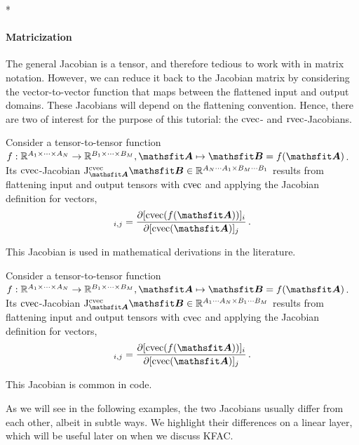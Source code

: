 \switchcolumn[1]*
\switchcolumn[0]

\paragraph{Matricization} The general Jacobian is a tensor, and therefore tedious to work with in matrix notation.
However, we can reduce it back to the Jacobian matrix by considering the vector-to-vector function that maps between the flattened input and output domains.
These Jacobians will depend on the flattening convention.
Hence, there are two of interest for the purpose of this tutorial: the $\operatorname{cvec}$- and $\operatorname{rvec}$-Jacobians.


\begin{definition}\label{def:cvec_jacobian}
  Consider a tensor-to-tensor function $f: \sR^{A_1 \times \dots \times A_N} \to \sR^{B_1 \times \dots \times B_M}, \tA \mapsto \tB = f(\tA)$. Its $\operatorname{cvec}$-Jacobian $\jac^{\cvec}_{\tA}\tB \in \sR^{A_N \cdots A_1 \times B_M \cdots B_1}$ results from flattening input and output tensors with $\operatorname{cvec}$ and applying the Jacobian definition for vectors,
  \begin{align*}
    [\jac^{\cvec}_{\tA}\tB]_{i,j}
    =
    \frac{\partial [\cvec(f(\tA))]_i}{\partial [\cvec(\tA)]_j}\,.
  \end{align*}
\end{definition}
This Jacobian is used in mathematical derivations in the literature.

\begin{definition}\label{def:rvec_jacobian}
  Consider a tensor-to-tensor function $f: \sR^{A_1 \times \dots \times A_N} \to \sR^{B_1 \times \dots \times B_M}, \tA \mapsto \tB = f(\tA)$. Its $\operatorname{cvec}$-Jacobian $\jac^{\cvec}_{\tA}\tB \in \sR^{A_1 \cdots A_N \times B_1 \cdots B_M}$ results from flattening input and output tensors with $\operatorname{cvec}$ and applying the Jacobian definition for vectors,
  \begin{align*}
    [\jac^{\cvec}_{\tA}\tB]_{i,j}
    =
    \frac{\partial [\cvec(f(\tA))]_i}{\partial [\cvec(\tA)]_j}\,.
  \end{align*}
\end{definition}
This Jacobian is common in code.

As we will see in the following examples, the two Jacobians usually differ from each other, albeit in subtle ways. We highlight their differences on a linear layer, which will be useful later on when we discuss KFAC.


